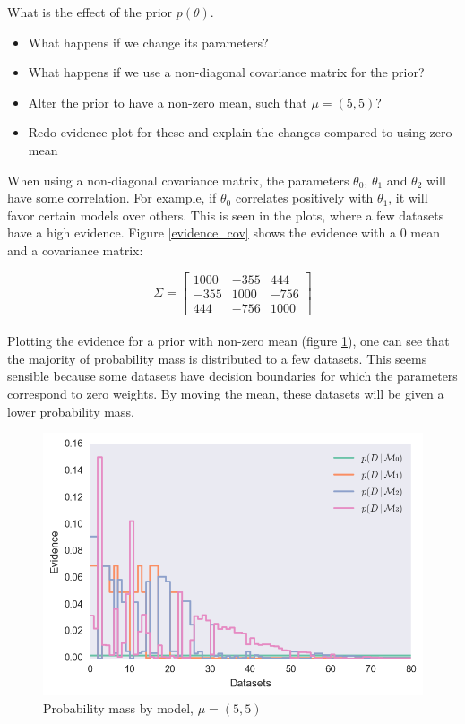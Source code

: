 \documentclass[12pt]{article}
\newenvironment{question}[2][Question]{\begin{trivlist}
\kern10pt
\item[\hskip \labelsep {\bfseries #1}\hskip \labelsep {\bfseries #2.}]}{\end{trivlist}}
\newcommand*{\answer}{%
  \par
  \kern1pt
  \begingroup
    \centering
    \raisebox{.2\baselineskip}{%
      \textcolor{gray}{
	    \rule{.6667\linewidth}{.1pt}%
      }
    }%
    \par
  \kern8pt
  \endgroup
}
\begin{document}
\begin{question}{29}
What is the effect of the prior $p(\theta)$.
\begin{itemize}
\item What happens if we change its parameters?
\item What happens if we use a non-diagonal covariance matrix for the prior?
\item Alter the prior to have a non-zero mean, such that $\mu = (5, 5)$?
\item Redo evidence plot for these and explain the changes compared to using zero-mean
\end{itemize}
\answer

When using a non-diagonal covariance matrix, the parameters $\theta_0$, $\theta_1$ and $\theta_2$ will have some correlation. For example, if $\theta_0$ correlates positively with $\theta_1$, it will favor certain models over others. This is seen in the plots, where a few datasets have a high evidence. Figure \ref{evidence_cov} shows the evidence with a 0 mean and a covariance matrix:

$$\Sigma = 
\begin{bmatrix}
1000 & -355 & 444\\
-355 &  1000 & -756 \\
444 & -756 & 1000
\end{bmatrix}$$
\\
Plotting the evidence for a prior with non-zero mean (figure \ref{evidence_mu}), one can see that the majority of probability mass is distributed to a few datasets. This seems sensible because some datasets have decision boundaries for which the parameters correspond to zero weights. By moving the mean, these datasets will be given a lower probability mass.

\begin{figure}
\includegraphics[scale=.7]{evidence_mu}
\centering
\caption{Probability mass by model, $\mu = (5,5)$}
\label{evidence_mu}
\end{figure}


\end{question}
\end{document}
